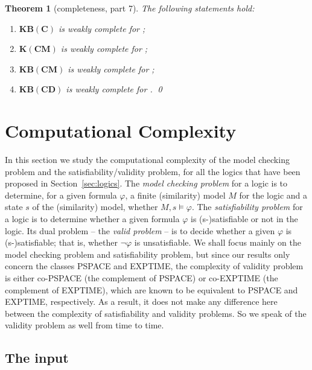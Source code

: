 \documentclass{article}
\newtheorem{theorem}{Theorem}
\renewcommand{\phi}{\varphi}
\newcommand{\lcm}{\text{\normalfont ELCM}\xspace}
\newcommand{\lsc}{\text{\normalfont ELC$^s$}\xspace}
\newcommand{\lscd}{\text{\normalfont ELCD$^s$}\xspace}
\newcommand{\lscm}{\text{\normalfont ELCM$^s$}\xspace}
\newcommand{\KCM}{\ensuremath{\mathbf{K(CM)}}\xspace}
\newcommand{\KBC}{\ensuremath{\mathbf{KB(C)}}\xspace}
\newcommand{\KBCD}{\ensuremath{\mathbf{KB(CD)}}\xspace}
\newcommand{\KBCM}{\ensuremath{\mathbf{KB(CM)}}\xspace}
\begin{document}
\begin{theorem}[completeness, part 7]
The following statements hold:
\begin{enumerate}
\item \KBC is weakly complete for \lsc;
\item \KCM is weakly complete for \lcm;
\item \KBCM is weakly complete for \lscm;
\item \KBCD is weakly complete for \lscd.
\qed
\end{enumerate}
\end{theorem}

\section{Computational Complexity}
\label{sec:complexity}

In this section we study the computational complexity of the model checking problem and the satisfiability/validity problem, for all the logics that have been proposed in Section~\ref{sec:logics}. The \emph{model checking problem} for a logic is to determine, for a given formula $\phi$, a finite (similarity) model $M$ for the logic and a state $s$ of the (similarity) model, whether $M, s \models \phi$. The \emph{satisfiability problem} for a logic is to determine whether a given formula $\phi$ is (s-)satisfiable or not in the logic. Its dual problem -- the \emph{valid problem} -- is to decide whether a given $\phi$ is (s-)satisfiable; that is, whether $\neg \phi$ is unsatisfiable. We shall focus mainly on the model checking problem and satisfiability problem, but since our results only concern the classes PSPACE and EXPTIME, the complexity of validity problem is either co-PSPACE (the complement of PSPACE) or co-EXPTIME (the complement of EXPTIME), which are known to be equivalent to PSPACE and EXPTIME, respectively. As a result, it does not make any difference here between the complexity of satisfiability and validity problems. So we speak of the validity problem as well from time to time.

\subsection{The input}
\end{document}
